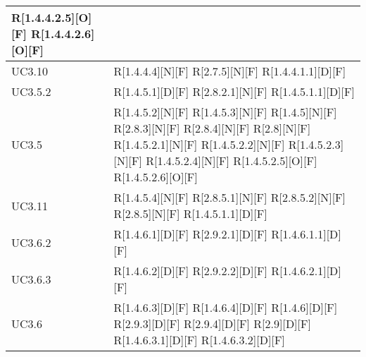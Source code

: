 \begin{longtable}{X | X}
R[1.4.4.2.5][O][F] \newline
R[1.4.4.2.6][O][F]  \\
\hline
UC3.10 & R[1.4.4.4][N][F] \newline
R[2.7.5][N][F] \newline
R[1.4.4.1.1][D][F]  \\
\hline
UC3.5.2 & R[1.4.5.1][D][F] \newline
R[2.8.2.1][N][F] \newline
R[1.4.5.1.1][D][F]  \\
\hline
UC3.5 & R[1.4.5.2][N][F] \newline
R[1.4.5.3][N][F] \newline
R[1.4.5][N][F] \newline
R[2.8.3][N][F] \newline
R[2.8.4][N][F] \newline
R[2.8][N][F] \newline
R[1.4.5.2.1][N][F] \newline
R[1.4.5.2.2][N][F] \newline
R[1.4.5.2.3][N][F] \newline
R[1.4.5.2.4][N][F] \newline
R[1.4.5.2.5][O][F] \newline
R[1.4.5.2.6][O][F]  \\
\hline
UC3.11 & R[1.4.5.4][N][F] \newline
R[2.8.5.1][N][F] \newline
R[2.8.5.2][N][F] \newline
R[2.8.5][N][F] \newline
R[1.4.5.1.1][D][F]  \\
\hline
UC3.6.2 & R[1.4.6.1][D][F] \newline
R[2.9.2.1][D][F] \newline
R[1.4.6.1.1][D][F]  \\
\hline
UC3.6.3 & R[1.4.6.2][D][F] \newline
R[2.9.2.2][D][F] \newline
R[1.4.6.2.1][D][F]  \\
\hline
UC3.6 & R[1.4.6.3][D][F] \newline
R[1.4.6.4][D][F] \newline
R[1.4.6][D][F] \newline
R[2.9.3][D][F] \newline
R[2.9.4][D][F] \newline
R[2.9][D][F] \newline
R[1.4.6.3.1][D][F] \newline
R[1.4.6.3.2][D][F] \newline

\end{longtable}
